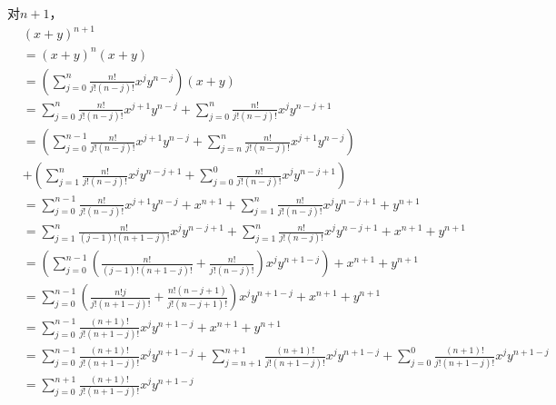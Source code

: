 \documentclass{article}
\theoremstyle{mystyle}
\begin{document}
对$n+1$，
\begin{align*}
        & (x+y)^{n+1}                                                                                        \\
        & = (x+y)^n (x+y)                                                                                    \\
        & = (\sum \limits_{j=0}^n \frac{n!}{j!(n-j)!} x^j y^{n-j}) (x+y)                                     \\
        & =
       \sum \limits_{j=0}^n \frac{n!}{j!(n-j)!} x^{j+1} y^{n-j}
       +
       \sum \limits_{j=0}^n \frac{n!}{j!(n-j)!} x^j y^{n-j+1}                                                \\
        & =
       (
       \sum \limits_{j=0}^{n-1} \frac{n!}{j!(n-j)!} x^{j+1} y^{n-j}
       +
       \sum \limits_{j=n}^{n} \frac{n!}{j!(n-j)!} x^{j+1} y^{n-j}
       )                                                                                                     \\
        & +
       (
       \sum \limits_{j=1}^n \frac{n!}{j!(n-j)!} x^j y^{n-j+1}
       +
       \sum \limits_{j=0}^0 \frac{n!}{j!(n-j)!} x^j y^{n-j+1}
       )                                                                                                     \\
        & = \sum \limits_{j=0}^{n-1} \frac{n!}{j!(n-j)!} x^{j+1} y^{n-j} + x^{n+1}
       + \sum \limits_{j=1}^n \frac{n!}{j!(n-j)!} x^j y^{n-j+1} + y^{n+1}                                    \\
        & = \sum \limits_{j=1}^{n} \frac{n!}{(j-1)!(n+1-j)!} x^{j} y^{n-j+1}
       + \sum \limits_{j=1}^n \frac{n!}{j!(n-j)!} x^j y^{n-j+1}
       + x^{n+1} + y^{n+1}                                                                                   \\
        & = (\sum \limits_{j=0}^{n-1} (\frac{n!}{(j-1)!(n+1-j)!} + \frac{n!}{j!(n-j)!}) x^{j} y^{n+1-j})
       + x^{n+1} + y^{n+1}                                                                                   \\
        & = \sum \limits_{j=0}^{n-1} (\frac{n!j}{j!(n+1-j)!} + \frac{n!(n-j+1)}{j!(n-j+1)!}) x^{j} y^{n+1-j}
       + x^{n+1} + y^{n+1}                                                                                   \\
        & =  \sum \limits_{j=0}^{n-1} \frac{(n+1)!}{j!(n+1-j)!} x^{j} y^{n+1-j}
       + x^{n+1} + y^{n+1}                                                                                   \\
        & =  \sum \limits_{j=0}^{n-1} \frac{(n+1)!}{j!(n+1-j)!} x^{j} y^{n+1-j}
       +  \sum \limits_{j=n+1}^{n+1} \frac{(n+1)!}{j!(n+1-j)!} x^{j} y^{n+1-j}
       +  \sum \limits_{j=0}^{0} \frac{(n+1)!}{j!(n+1-j)!} x^{j} y^{n+1-j}                                   \\
        & = \sum \limits_{j=0}^{n+1} \frac{(n+1)!}{j!(n+1-j)!} x^{j} y^{n+1-j}
\end{align*}
\end{document}

